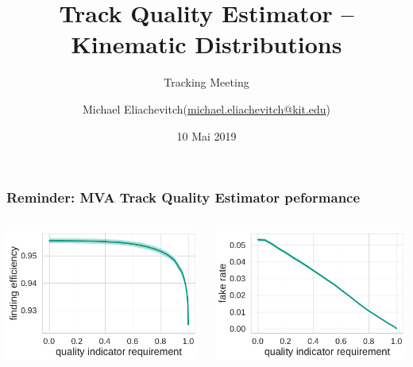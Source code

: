 \documentclass[18pt, aspectratio=169]{beamer}
\title{Track Quality Estimator -- Kinematic Distributions}
\subtitle{Tracking Meeting}
\author[Michael Eliachevitch
(\href{mailto:michael.eliachevitch@kit.edu}{michael.eliachevitch@kit.edu})]{Michael Eliachevitch(\href{mailto:michael.eliachevitch@kit.edu}{michael.eliachevitch@kit.edu})}
\institute[ETP -- KIT]{Institut für Experimentelle Teilchenphysik (ETP) -- KIT}
\date{10 Mai 2019}
\begin{document}
\maketitle

\begin{frame}
  \frametitle{Reminder:  MVA Track Quality Estimator peformance}
  \begin{columns}
    \begin{column}{.33\textwidth}
      \centering
      \includegraphics[width=\textwidth]{figures/combined-qi/fullqi_findeff.pdf}\\
    \end{column}
    \begin{column}{.33\textwidth}
      \centering
      \includegraphics[width=\textwidth]{figures/combined-qi/fullqi_fake_rate.pdf}\\
    \end{column}

\end{columns}
\end{frame}
\end{document}

